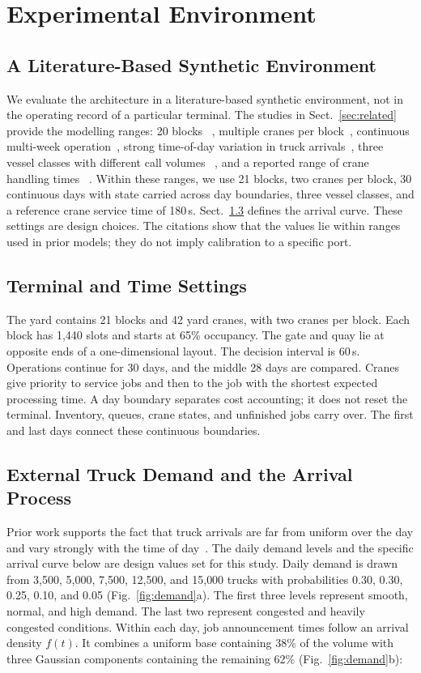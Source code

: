 \section{Experimental Environment}
\label{sec:env}

\subsection{A Literature-Based Synthetic Environment}
\label{sec:env-calib}
We evaluate the architecture in a literature-based synthetic environment,
not in the operating record of a particular terminal. The studies in
Sect.~\ref{sec:related} provide the modelling ranges: 20 blocks
~\cite{ref16}, multiple cranes per block~\cite{ref8}, continuous
multi-week operation~\cite{ref9}, strong time-of-day variation in truck
arrivals~\cite{ref13}, three vessel classes with different call volumes
~\cite{ref16}, and a reported range of crane handling times
~\cite{ref9}. Within these ranges, we use 21 blocks, two cranes per
block, 30 continuous days with state carried across day boundaries,
three vessel classes, and a reference crane service time of 180\,s.
Sect.~\ref{sec:env-demand} defines the arrival curve. These settings are
design choices. The citations show that the values lie within ranges
used in prior models; they do not imply calibration to a specific port.

\subsection{Terminal and Time Settings}
\label{sec:env-terminal}
The yard contains 21 blocks and 42 yard cranes, with two cranes per
block. Each block has 1{,}440 slots and starts at 65\% occupancy. The
gate and quay lie at opposite ends of a one-dimensional layout. The
decision interval is 60\,s. Operations continue for 30 days, and the
middle 28 days are compared. Cranes give priority to service jobs and
then to the job with the shortest expected processing time. A day
boundary separates cost accounting; it does not reset the terminal.
Inventory, queues, crane states, and unfinished jobs carry over. The
first and last days connect these continuous boundaries.

\subsection{External Truck Demand and the Arrival Process}
\label{sec:env-demand}
Prior work supports the fact that truck arrivals are far from uniform
over the day and vary strongly with the time of day~\cite{ref13}. The
daily demand levels and the specific arrival curve below are design
values set for this study. Daily demand is drawn from 3{,}500, 5{,}000, 7{,}500, 12{,}500,
and 15{,}000 trucks with probabilities 0.30, 0.30, 0.25, 0.10, and
0.05 (Fig.~\ref{fig:demand}a). The first three levels represent smooth,
normal, and high demand. The last two represent congested and heavily
congested conditions. Within each day, job announcement times follow an
arrival density $f(t)$. It combines a uniform base containing 38\% of
the volume with three Gaussian components containing the remaining
62\% (Fig.~\ref{fig:demand}b):

